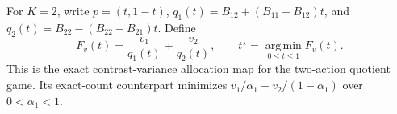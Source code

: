 For \(K=2\), write \(p=(t,1-t)\), \(q_1(t)=B_{12}+(B_{11}-B_{12})t\), and \(q_2(t)=B_{22}-(B_{22}-B_{21})t\).  Define
\[
F_v(t)=\frac{v_1}{q_1(t)}+\frac{v_2}{q_2(t)},\qquad
t^\star=\operatorname*{arg\,min}_{0\leq t\leq1}F_v(t).
\]
This is the exact contrast-variance allocation map for the two-action quotient game.  Its exact-count counterpart minimizes \(v_1/\alpha_1+v_2/(1-\alpha_1)\) over \(0<\alpha_1<1\).
